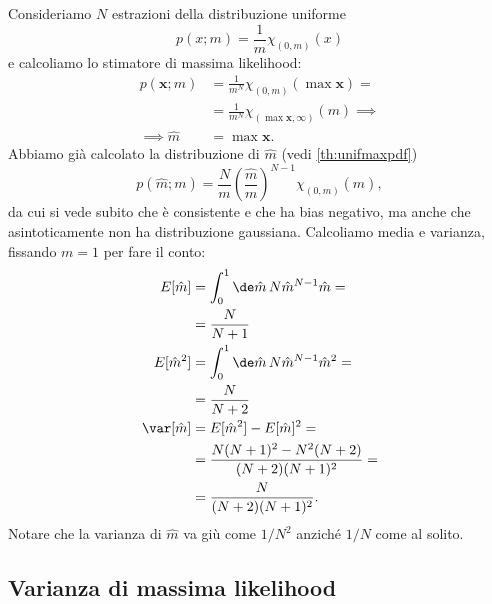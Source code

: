 \begin{example}
	Consideriamo $N$ estrazioni della distribuzione uniforme
	\begin{equation*}
		p(x;m) = \frac 1m \chi_{(0,m)}(x)
	\end{equation*}
	e calcoliamo lo stimatore di massima likelihood:
	\begin{align*}
		p(\mathbf x;m)
		&= \frac1{m^N} \chi_{(0,m)}(\max\mathbf x) = \\
		&= \frac1{m^N} \chi_{(\max\mathbf x,\infty)}(m) \implies \\
		\implies \hat m&=\max\mathbf x.
	\end{align*}
	Abbiamo già calcolato la distribuzione di $\hat m$ (vedi \autoref{th:unifmaxpdf})
	\begin{equation*}
		p(\hat m;m)
		= \frac Nm \left(\frac{\hat m}m\right)^{N-1} \chi_{(0,m)}(\hat m),
	\end{equation*}
	da cui si vede subito che è consistente
	e che ha bias negativo,
	ma anche che asintoticamente non ha distribuzione gaussiana.
	Calcoliamo media e varianza, fissando $m=1$ per fare il conto:
	\begin{align*}
		E[\hat m]
		&= \int_0^1 \de\hat m\, N \hat m^{N-1} \hat m = \\
		&= \frac N{N+1} \\
		E[\hat m^2]
		&= \int_0^1 \de\hat m\, N \hat m^{N-1} \hat m^2 = \\
		&= \frac N{N+2} \\
		\var[\hat m]
		&= E[\hat m^2] - E[\hat m]^2 = \\
		&= \frac{N(N+1)^2 - N^2(N+2)}{(N+2)(N+1)^2} = \\
		&= \frac N{(N+2)(N+1)^2}.
	\end{align*}
    Notare che la varianza di $\hat m$ va giù come $1/N^2$ anziché $1/N$ come
    al solito.
\end{example}

\subsection{Varianza di massima likelihood}

